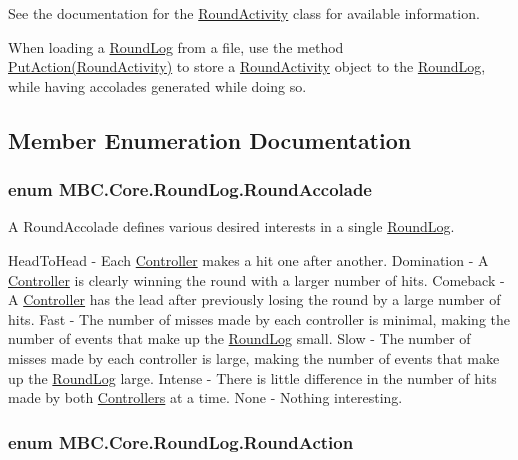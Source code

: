See the documentation for the \hyperlink{class_m_b_c_1_1_core_1_1_round_log_1_1_round_activity}{Round\-Activity} class for available information.

When loading a \hyperlink{class_m_b_c_1_1_core_1_1_round_log}{Round\-Log} from a file, use the method \hyperlink{class_m_b_c_1_1_core_1_1_round_log_a0bb405409acf2b889d714bbff68abc94}{Put\-Action(\-Round\-Activity)} to store a \hyperlink{class_m_b_c_1_1_core_1_1_round_log_1_1_round_activity}{Round\-Activity} object to the \hyperlink{class_m_b_c_1_1_core_1_1_round_log}{Round\-Log}, while having accolades generated while doing so. 

\subsection{Member Enumeration Documentation}
\hypertarget{class_m_b_c_1_1_core_1_1_round_log_a4060830ca7135aa755ec5b6d24aa30e6}{
\subsubsection[{Round\-Accolade}]{\setlength{\rightskip}{0pt plus 5cm}enum {\bf M\-B\-C.\-Core.\-Round\-Log.\-Round\-Accolade}}}\label{class_m_b_c_1_1_core_1_1_round_log_a4060830ca7135aa755ec5b6d24aa30e6}


A Round\-Accolade defines various desired interests in a single \hyperlink{class_m_b_c_1_1_core_1_1_round_log}{Round\-Log}. 

Head\-To\-Head -\/ Each \hyperlink{class_m_b_c_1_1_core_1_1_controller}{Controller} makes a hit one after another. Domination -\/ A \hyperlink{class_m_b_c_1_1_core_1_1_controller}{Controller} is clearly winning the round with a larger number of hits. Comeback -\/ A \hyperlink{class_m_b_c_1_1_core_1_1_controller}{Controller} has the lead after previously losing the round by a large number of hits. Fast -\/ The number of misses made by each controller is minimal, making the number of events that make up the \hyperlink{class_m_b_c_1_1_core_1_1_round_log}{Round\-Log} small. Slow -\/ The number of misses made by each controller is large, making the number of events that make up the \hyperlink{class_m_b_c_1_1_core_1_1_round_log}{Round\-Log} large. Intense -\/ There is little difference in the number of hits made by both \hyperlink{namespace_m_b_c_1_1_controllers}{Controllers} at a time. None -\/ Nothing interesting. \hypertarget{class_m_b_c_1_1_core_1_1_round_log_af3f9f76d90fb391108dd1eaeaeae27e4}{
\subsubsection[{Round\-Action}]{\setlength{\rightskip}{0pt plus 5cm}enum {\bf M\-B\-C.\-Core.\-Round\-Log.\-Round\-Action}}}\label{class_m_b_c_1_1_core_1_1_round_log_af3f9f76d90fb391108dd1eaeaeae27e4}



